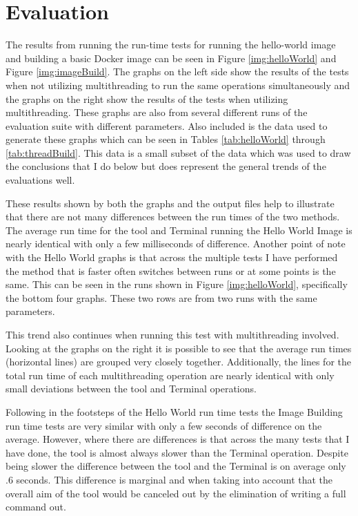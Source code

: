 \section{Evaluation}
\label{sec:eval}

The results from running the run-time tests for running the hello-world image and building a basic Docker image can be seen in Figure \ref{img:helloWorld} and Figure \ref{img:imageBuild}. The graphs on the left side show the results of the tests when not utilizing multithreading to run the same operations simultaneously and the graphs on the right show the results of the tests when utilizing multithreading. These graphs are also from several different runs of the evaluation suite with different parameters. Also included is the data used to generate these graphs which can be seen in Tables \ref{tab:helloWorld} through \ref{tab:threadBuild}. This data is a small subset of the data which was used to draw the conclusions that I do below but does represent the general trends of the evaluations well.

These results shown by both the graphs and the output files help to illustrate that there are not many differences between the run times of the two methods. The average run time for the tool and Terminal running the Hello World Image is nearly identical with only a few milliseconds of difference. Another point of note with the Hello World graphs is that across the multiple tests I have performed the method that is faster often switches between runs or at some points is the same. This can be seen in the runs shown in Figure \ref{img:helloWorld}, specifically the bottom four graphs. These two rows are from two runs with the same parameters.

This trend also continues when running this test with multithreading involved. Looking at the graphs on the right it is possible to see that the average run times (horizontal lines) are grouped very closely together. Additionally, the lines for the total run time of each multithreading operation are nearly identical with only small deviations between the tool and Terminal operations.

Following in the footsteps of the Hello World run time tests the Image Building run time tests are very similar with only a few seconds of difference on the average. However, where there are differences is that across the many tests that I have done, the tool is almost always slower than the Terminal operation. Despite being slower the difference between the tool and the Terminal is on average only .6 seconds. This difference is marginal and when taking into account that the overall aim of the tool would be canceled out by the elimination of writing a full command out.

